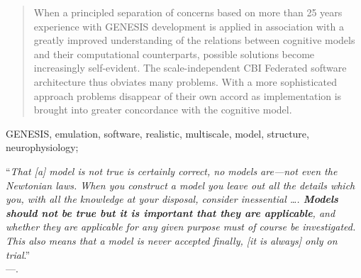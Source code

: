 \documentclass[11pt,3p,twocolumn]{JMN}
\begin{document}
\begin{frontmatter}
\begin{abstract}
When a principled separation of concerns based on more than 25 years experience with  GENESIS development is applied in association with a greatly improved understanding of the relations between cognitive models and their computational counterparts, possible solutions become increasingly self-evident. The scale-independent CBI Federated software architecture thus obviates many problems. With a more sophisticated approach problems disappear of their own accord as implementation is brought into greater concordance with the cognitive model.
\end{abstract}

\begin{keyword}
 GENESIS, emulation, software, realistic, multiscale, model, structure, neurophysiology;

\vspace*{1\baselineskip}
\hspace*{0.05\textwidth}\begin{minipage}{0.9\textwidth}

\noindent ``\small{\textit{That \textnormal{[a]} model is not true is certainly correct, no models are—not even the Newtonian laws. When you construct a model you leave out all the details which you, with all the knowledge at your disposal, consider inessential \ldots. \textbf{Models should not be true but it is important that they are applicable}, and whether they are applicable for any given purpose must of course be investigated. This also means that a model is never accepted finally, \textnormal{[it is always]} only on trial}.}''\\
---\citet[pp.\,37--38]{rasch80}.\\
\end{minipage}

\end{keyword}

\end{frontmatter}

\end{document}
